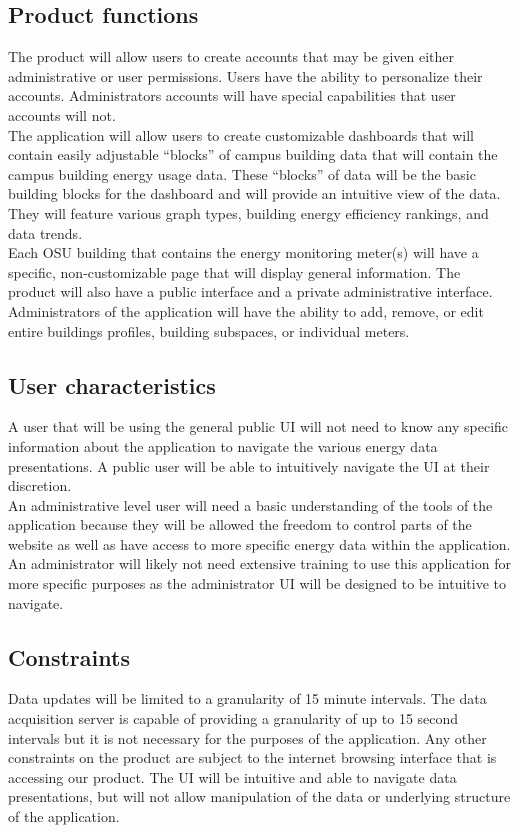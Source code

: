 \documentclass[onecolumn, draftclsnofoot,10pt, compsoc]{IEEEtran}
\begin{document}
    \subsection{Product functions}
    The product will allow users to create accounts that may be given either administrative or user permissions. Users have the ability to personalize their accounts. Administrators accounts will have special capabilities that user accounts will not. \\
    The application will allow users to create customizable dashboards that will contain easily adjustable “blocks” of campus building data that will contain the campus building energy usage data. These “blocks” of data will be the basic building blocks for the dashboard and will provide an intuitive view of the data. They will feature various graph types, building energy efficiency rankings, and data trends.\\
    Each OSU building that contains the energy monitoring meter(s) will have a specific, non-customizable page that will display general information. The product will also have a public interface and a private administrative interface.\\
    Administrators of the application will have the ability to add, remove, or edit entire buildings profiles, building subspaces, or individual meters.
    
    \subsection{User characteristics}
    A user that will be using the general public UI will not need to know any specific information about the application to navigate the various energy data presentations. A public user will be able to intuitively navigate the UI at their discretion. \\ 
    An administrative level user will need a basic understanding of the tools of the application because they will be allowed the freedom to control parts of the website as well as have access to more specific energy data within the application. An administrator will likely not need extensive training to use this application for more specific purposes as the administrator UI will be designed to be intuitive to navigate.
    \subsection{Constraints}
    Data updates will be limited to a granularity of 15 minute intervals. The data acquisition server is capable of providing a granularity of up to 15 second intervals but it is not necessary for the purposes of the application. Any other constraints on the product are subject to the internet browsing interface that is accessing our product. The UI will be intuitive and able to navigate data presentations, but will not allow manipulation of the data or underlying structure of the application.
    
\end{document}
